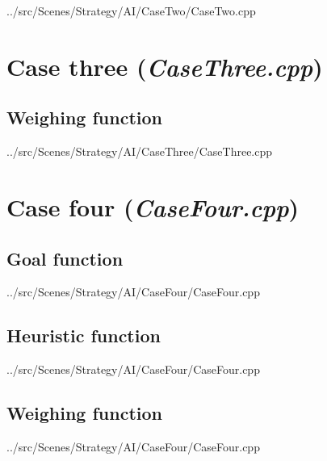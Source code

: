 \documentclass[11pt, a4paper]{report}
\begin{document}
\begin{appendices}
\linespread{0.8}

{../src/Scenes/Strategy/AI/CaseTwo/CaseTwo.cpp}
\linespread{1.5}
\pagebreak

\section[Case three]{Case three (\emph{CaseThree.cpp})}
\label{sec:caseThreeSourceCode}

\subsection{Weighing function}
\label{subsec:caseThreeWeighingFunction}

\linespread{0.8}

{../src/Scenes/Strategy/AI/CaseThree/CaseThree.cpp}
\linespread{1.5}
\pagebreak

\section[Case four]{Case four (\emph{CaseFour.cpp})}
\label{sec:caseFourSourceCode}

\subsection{Goal function}
\label{subsec:caseFourGoalFunction}

\linespread{0.8}

{../src/Scenes/Strategy/AI/CaseFour/CaseFour.cpp}
\linespread{1.5}
\pagebreak

\subsection{Heuristic function}
\label{subsec:caseFourHeuristicFunction}

\linespread{0.8}

{../src/Scenes/Strategy/AI/CaseFour/CaseFour.cpp}
\linespread{1.5}
\pagebreak

\subsection{Weighing function}
\label{subsec:caseFourWeighingFunction}

\linespread{0.8}

{../src/Scenes/Strategy/AI/CaseFour/CaseFour.cpp}
\linespread{1.5}
\pagebreak

\end{appendices}
\end{document}
